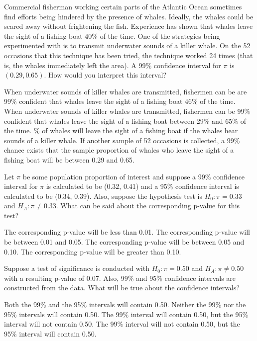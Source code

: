 \documentclass{article}
\begin{document}
\begin{mcquestions}
		\question Commercial fisherman working certain parts of the Atlantic Ocean sometimes find efforts being hindered by the presence of whales. Ideally, the whales could be scared away without frightening the fish. Experience has shown that whales leave the sight of a fishing boat 40\% of the time. One of the strategies being experimented with is to transmit underwater sounds of a killer whale. On the 52 occasions that this technique has been tried, the technique worked 24 times (that is, the whales immediately left the area).
		A 99\% confidence interval for $\pi$ is $(0.29, 0.65)$. How would you interpret this interval?
		\begin{mcanswerslist}
			\answer When underwater sounds of killer whales are transmitted, fishermen can be are 99\% confident that whales leave the sight of a fishing boat 46\% of the time.
			\answer[correct] When underwater sounds of killer whales are transmitted, fishermen can be 99\% confident that whales leave the sight of a fishing boat between 29\% and 65\% of the time.
			\% of whales will leave the sight of a fishing boat if the whales hear sounds of a killer whale.
			\answer If another sample of 52 occasions is collected, a 99\% chance exists that the sample proportion of whales who leave the sight of a fishing boat will be between 0.29 and 0.65.
		\end{mcanswerslist}
		
		\question Let $\pi$ be some population proportion of interest and suppose a 99\% confidence interval for $\pi$ is calculated to be (0.32, 0.41) and a 95\% confidence interval is calculated to be (0.34, 0.39). Also, suppose the hypothesis test is $H_0: \pi = 0.33$ and $H_A: \pi \neq 0.33$. What can be said about the corresponding p-value for this test?
		\begin{mcanswerslist}
			\answer The corresponding p-value will be less than 0.01.
			\answer[correct] The corresponding p-value will be between 0.01 and 0.05.
			\answer The corresponding p-value will be between 0.05 and 0.10.
			\answer The corresponding p-value will be greater than 0.10.
		\end{mcanswerslist}
		
		\question Suppose a test of significance is conducted with $H_0: \pi = 0.50$ and $H_A: \pi \neq 0.50$ with a resulting p-value of 0.07.  Also, 99\% and 95\% confidence intervals are constructed from the data.
		What will be true about the confidence intervals?
		\begin{mcanswerslist}
			\answer Both the 99\% and the 95\% intervals will contain 0.50.
			\answer[correct] Neither the 99\% nor the 95\% intervals will contain 0.50.
			\answer The 99\% interval will contain 0.50, but the 95\% interval will not contain 0.50.
			\answer The 99\% interval will not contain 0.50, but the 95\% interval will contain 0.50.
		\end{mcanswerslist}
		
		
	\end{mcquestions}
\end{document}
